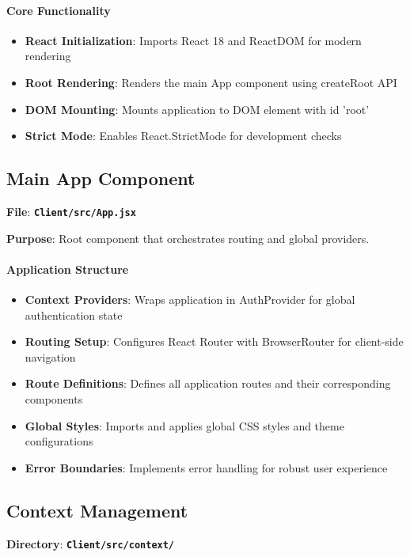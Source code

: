 \documentclass[12pt,a4paper]{article}
\newcommand{\file}[1]{\textbf{\texttt{#1}}}
\begin{document}
\paragraph{Core Functionality}
\begin{itemize}
\item \textbf{React Initialization}: Imports React 18 and ReactDOM for modern rendering
\item \textbf{Root Rendering}: Renders the main App component using createRoot API
\item \textbf{DOM Mounting}: Mounts application to DOM element with id 'root'
\item \textbf{Strict Mode}: Enables React.StrictMode for development checks
\end{itemize}

\subsection{Main App Component}
\label{subsec:main-app}

\textbf{File}: \file{Client/src/App.jsx}

\textbf{Purpose}: Root component that orchestrates routing and global providers.

\paragraph{Application Structure}
\begin{itemize}
\item \textbf{Context Providers}: Wraps application in AuthProvider for global authentication state
\item \textbf{Routing Setup}: Configures React Router with BrowserRouter for client-side navigation
\item \textbf{Route Definitions}: Defines all application routes and their corresponding components
\item \textbf{Global Styles}: Imports and applies global CSS styles and theme configurations
\item \textbf{Error Boundaries}: Implements error handling for robust user experience
\end{itemize}

\subsection{Context Management}
\label{subsec:context-management}

\textbf{Directory}: \file{Client/src/context/}
\end{document}
